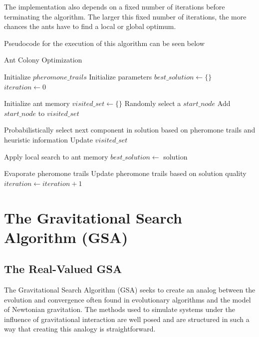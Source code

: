 \documentclass{article}
\begin{document}
The implementation also depends on a fixed number of iterations before terminating the algorithm. The larger this fixed number of iterations, the more chances the ants have to find a local or global optimum.

Pseudocode for the execution of this algorithm can be seen below
\begin{algorithm}[!h]
    \DontPrintSemicolon
    \caption{Ant Colony Optimization}
    \label{alg:aco}
    \KwResult{}

    Initialize $pheromone\_trails$\;
    Initialize parameters\;
    $best\_solution\gets\{\}$\;
    $iteration\gets0$\;
    {
        {
            Initialize ant memory\;
            $visited\_set\gets\{\}$\;
            Randomly select a $start\_node$\;
            Add $start\_node$ to $visited\_set$\;

            {
                Probabilistically select next component in solution based on pheromone trails and heuristic information\;
                Update $visited\_set$\;
            }
        
            Apply local search to ant memory\;
            {
                $best\_solution\gets$ solution\;
            }
        }
        Evaporate pheromone trails\;
        Update pheromone trails based on solution quality\;
        $iteration\gets iteration + 1$
    }
    
\end{algorithm}
\newpage

\section{The Gravitational Search Algorithm (GSA)}

    \subsection{The Real-Valued GSA}

        The Gravitational Search Algorithm (GSA) seeks to create an analog between the evolution and convergence often found in evolutionary algorithms and the model of Newtonian gravitation.  The methods used to simulate systems under the influence of gravitational interaction are well posed and are structured in such a way that creating this analogy is straightforward.
        
\end{document}

